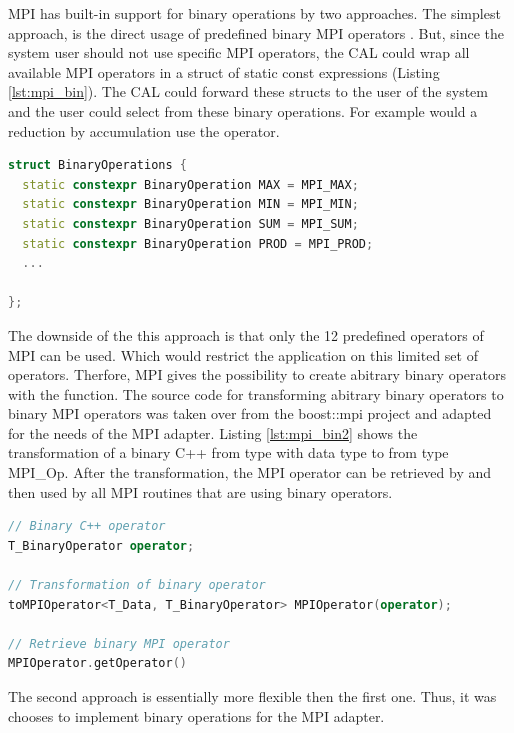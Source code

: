MPI has built-in support for binary operations by two approaches. The
simplest approach, is the direct usage of predefined binary MPI
operators \cite{ref:mpi_bin_op}. But, since the system user should not
use specific MPI operators, the CAL could wrap all available MPI
operators in a struct of static const expressions (Listing
\ref{lst:mpi_bin}).  The CAL could forward these structs to the user
of the system and the user could select from these binary operations.
For example would a reduction by accumulation use the
 operator.

\begin{lstlisting}[language=C++, caption={A small collection of binary operators by transformed MPI operations to static constexpression }, label=lst:mpi_bin]
struct BinaryOperations { 
  static constexpr BinaryOperation MAX = MPI_MAX; 
  static constexpr BinaryOperation MIN = MPI_MIN; 
  static constexpr BinaryOperation SUM = MPI_SUM; 
  static constexpr BinaryOperation PROD = MPI_PROD; 
  ...

};
\end{lstlisting}


\noindent The downside of the this approach is that only the 12 predefined
operators of MPI can be used. Which would restrict the application on this
limited set of operators. Therfore, MPI gives the possibility to
create abitrary binary operators with the 
function.  The source code for transforming abitrary binary operators
to binary MPI operators was taken over from the boost::mpi project
\cite{ref:boost_mpi} and adapted for the needs of the MPI adapter.
Listing \ref{lst:mpi_bin2} shows the transformation of a binary C++
 from type  with data type
 to  from type {MPI\_Op}.  After the
transformation, the MPI operator can be retrieved by
 and then used by all MPI routines that
are using binary operators.

\begin{lstlisting}[language=C++, caption={ }, label=lst:mpi_bin2]
// Binary C++ operator
T_BinaryOperator operator;  
  
// Transformation of binary operator
toMPIOperator<T_Data, T_BinaryOperator> MPIOperator(operator);

// Retrieve binary MPI operator
MPIOperator.getOperator()
\end{lstlisting}

\noindent The second approach is essentially more flexible then the first
one. Thus, it was chooses to implement binary operations for the
MPI adapter.


